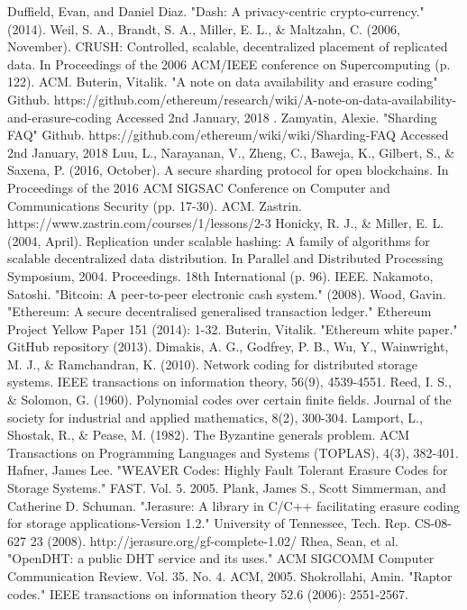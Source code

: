 \documentclass[conference]{IEEEtran}
\begin{document}
\begin{thebibliography}{00}
     Duffield, Evan, and Daniel Diaz. "Dash: A privacy-centric
        crypto-currency." (2014).
     Weil, S. A., Brandt, S. A., Miller, E. L., \& Maltzahn, C.
        (2006, November). CRUSH: Controlled, scalable, decentralized placement
        of replicated data. In Proceedings of the 2006 ACM/IEEE conference on
        Supercomputing (p. 122). ACM.
     Buterin, Vitalik. "A note on data availability and erasure coding"
        Github. https://github.com/ethereum/research/wiki/A-note-on-data-availability-and-erasure-coding
        Accessed 2nd January, 2018 . 
     Zamyatin, Alexie. "Sharding FAQ" Github.
        https://github.com/ethereum/wiki/wiki/Sharding-FAQ
        Accessed 2nd January, 2018
     Luu, L., Narayanan, V., Zheng, C., Baweja, K., Gilbert, S., \&
        Saxena, P. (2016, October). A secure sharding protocol for open
        blockchains. In Proceedings of the 2016 ACM SIGSAC Conference on
        Computer and Communications Security (pp. 17-30). ACM.
     Zastrin. https://www.zastrin.com/courses/1/lessons/2-3
     Honicky, R. J., \& Miller, E. L. (2004, April). Replication
        under scalable hashing: A family of algorithms for scalable
        decentralized data distribution. In Parallel and Distributed Processing
        Symposium, 2004. Proceedings. 18th International (p. 96). IEEE.
     Nakamoto, Satoshi. "Bitcoin: A peer-to-peer electronic cash
        system." (2008).
     Wood, Gavin. "Ethereum: A secure decentralised generalised
        transaction ledger." Ethereum Project Yellow Paper 151 (2014): 1-32.
     Buterin, Vitalik. "Ethereum white paper." GitHub repository
        (2013).
     Dimakis, A. G., Godfrey, P. B., Wu, Y., Wainwright, M. J., &
        Ramchandran, K. (2010). Network coding for distributed storage systems.
        IEEE transactions on information theory, 56(9), 4539-4551.
     Reed, I. S., \& Solomon, G. (1960). Polynomial codes over
        certain finite fields. Journal of the society for industrial and applied
        mathematics, 8(2), 300-304.
     Lamport, L., Shostak, R., & Pease, M. (1982). The Byzantine
        generals problem. ACM Transactions on Programming Languages and Systems
        (TOPLAS), 4(3), 382-401.
     Hafner, James Lee. "WEAVER Codes: Highly Fault
        Tolerant Erasure Codes for Storage Systems." FAST. Vol. 5. 2005.
    Plank, James S., Scott Simmerman, and Catherine D.
        Schuman. "Jerasure: A library in C/C++ facilitating erasure coding for
        storage applications-Version 1.2." University of Tennessee, Tech. Rep.
        CS-08-627 23 (2008).
     http://jerasure.org/gf-complete-1.02/
     Rhea, Sean, et al. "OpenDHT: a public DHT service and its uses." ACM SIGCOMM Computer Communication Review. Vol. 35. No. 4. ACM, 2005.
     Shokrollahi, Amin. "Raptor codes." IEEE transactions on information theory 52.6 (2006): 2551-2567.
\end{thebibliography}
\end{document}

